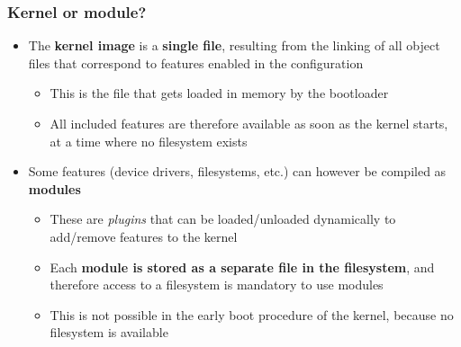 \begin{frame}
  \frametitle{Kernel or module?}
  \begin{itemize}
  \item The {\bf kernel image} is a {\bf single file}, resulting from
    the linking of all object files that correspond to features
    enabled in the configuration
    \begin{itemize}
    \item This is the file that gets loaded in memory by the
      bootloader
    \item All included features are therefore available as soon as the
      kernel starts, at a time where no filesystem exists
    \end{itemize}
  \item Some features (device drivers, filesystems, etc.) can however
    be compiled as {\bf modules}
    \begin{itemize}
    \item These are {\em plugins} that can be loaded/unloaded dynamically to
      add/remove features to the kernel
    \item Each {\bf module is stored as a separate file in the
        filesystem}, and therefore access to a filesystem is mandatory
      to use modules
    \item This is not possible in the early boot procedure of the
      kernel, because no filesystem is available
    \end{itemize}
  \end{itemize}
\end{frame}

